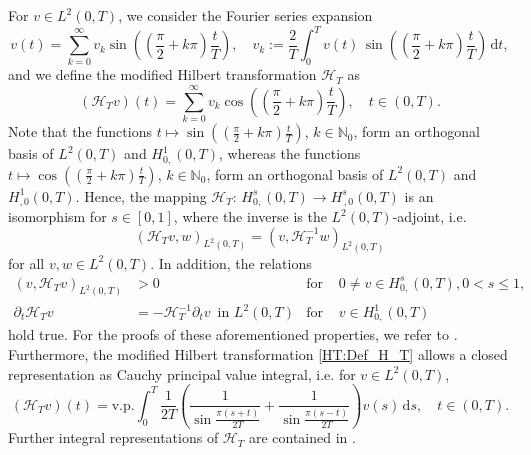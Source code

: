 \documentclass[a4paper,11pt]{article}
\newcommand{\N}{\mathbb N}
\begin{document}
	For $v \in L^2(0,T)$, we consider the Fourier series expansion
	\[
	v(t) = \sum\limits_{k=0}^\infty v_k \sin \left( \left(
	\frac{\pi}{2} + k \pi \right) \frac{t}{T} \right), \quad
	v_k := \frac{2}{T} \int_0^T v(t) \, \sin \left( \left(
	\frac{\pi}{2} + k \pi \right) \frac{t}{T} \right) \, \mathrm dt,
	\]
	and we define the modified Hilbert transformation ${\mathcal{H}}_T$ as
	\begin{equation}\label{HT:Def_H_T}
		({\mathcal{H}}_Tv)(t) = \sum\limits_{k=0}^\infty v_k \cos \left( \left(
		\frac{\pi}{2} + k \pi \right) \frac{t}{T} \right), \quad t \in (0,T).
	\end{equation}
	Note that the functions $t \mapsto \sin \left( \left(\frac{\pi}{2} + k \pi \right) \frac{t}{T} \right)$, $k \in \N_0$, form an orthogonal basis of $L^2(0,T)$ and $H^1_{0,}(0,T)$, whereas the functions $t \mapsto \cos \left( \left(\frac{\pi}{2} + k \pi \right) \frac{t}{T} \right)$, $k \in \N_0$, form an orthogonal basis of $L^2(0,T)$ and $H^1_{,0}(0,T)$. Hence, the mapping ${\mathcal{H}}_T \colon \, H^s_{0,}(0,T) \to H^s_{\,,0}(0,T)$ is an isomorphism for $s \in [0,1]$, where the inverse is the $L^2(0,T)$-adjoint,
	i.e.
	\begin{equation}  \label{HT:HTMinus1}
		( {\mathcal{H}_T}v , w )_{L^2(0,T)} =
		( v , {\mathcal{H}}_T^{-1} w )_{L^2(0,T)}
	\end{equation}
    for all $ v,w \in L^2(0,T)$. In addition, the relations
	\begin{align}
		( v , {\mathcal{H}}_T v )_{L^2(0,T)}
		&> 0 &\text{for }& 0\neq v \in H^s_{0,}(0,T), 0 < s \leq 1, \label{HT:positiv} \\
		\partial_t {\mathcal{H}}_T v
		&= - {\mathcal{H}}_T^{-1} \partial_t v \, \text{ in } L^2(0,T)
		&\text{for }& v \in H^1_{0,}(0,T)  \label{HT:vertauschen}
	\end{align}
	hold true. For the proofs of these aforementioned properties, we refer to
	\cite{SteinbachMissoni2022, SteinbachZankETNA2020, SteinbachZankJNUM2021, ZankDissBuch2020,   ZankCMAM2021, ZankInt2022}.
	Furthermore, the modified Hilbert transformation \eqref{HT:Def_H_T}
	allows a closed representation \cite[Lemma 2.8]{SteinbachZankETNA2020} as
	Cauchy principal value integral, i.e. for $v \in L^2(0,T)$,
	\[
	({\mathcal{H}}_T v)(t) =  {\mathrm  {v.p.}} \int_0^T \frac{1}{2T}
	\left(
	\frac{1}{\sin \frac{\pi(s+t)}{2T}} +
	\frac{1}{\sin \frac{\pi(s-t)}{2T}}
	\right) v(s) \, \mathrm ds, \quad t \in (0,T).
	\]
	Further integral representations of $\mathcal H_T$ are contained in \cite{SteinbachZankJNUM2021, ZankInt2022}.
	
\end{document}
